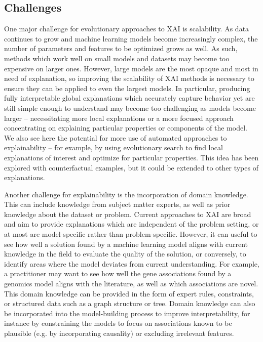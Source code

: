 \documentclass[graybox]{svmult}
\begin{document}
\subsection{Challenges}

One major challenge for evolutionary approaches to XAI is scalability. As data continues to grow and machine learning models become increasingly complex, the number of parameters and features to be optimized grows as well. As such, methods which work well on small models and datasets may become too expensive on larger ones. However, large models are the most opaque and most in need of explanation, so improving the scalability of XAI methods is necessary to ensure they can be applied to even the largest models. In particular, producing fully interpretable global explanations which accurately capture behavior yet are still simple enough to understand may become too challenging as models become larger -- necessitating more local explanations or a more focused approach concentrating on explaining particular properties or components of the model. We also see here the potential for more use of automated approaches to explainability -- for example, by using evolutionary search to find local explanations of interest and optimize for particular properties. This idea has been explored with counterfactual examples, but it could be extended to other types of explanations.

Another challenge for explainability is the incorporation of domain knowledge. This can include knowledge from subject matter experts, as well as prior knowledge about the dataset or problem. Current approaches to XAI are broad and aim to provide explanations which are independent of the problem setting, or at most are model-specific rather than problem-specific. However, it can useful to see how well a solution found by a machine learning model aligns with current knowledge in the field to evaluate the quality of the solution, or conversely, to identify areas where the model deviates from current understanding. For example, a practitioner may want to see how well the gene associations found by a genomics model aligns with the literature, as well as which associations are novel. This domain knowledge can be provided in the form of expert rules, constraints, or structured data such as a graph structure or tree. Domain knowledge can also be incorporated into the model-building process to improve interpretability, for instance by constraining the models to focus on associations known to be plausible (e.g. by incorporating causality) or excluding irrelevant features.
\end{document}
